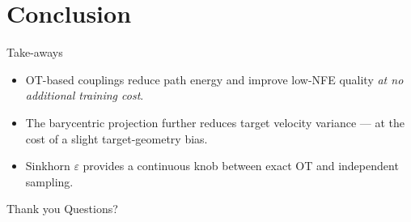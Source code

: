 \documentclass[10pt, aspectratio=169]{beamer}
\begin{document}
\section{Conclusion}

\begin{frame}{Take-aways}
    \begin{itemize}
        \item OT-based couplings reduce path energy and improve low-NFE quality
              \emph{at no additional training cost}.
        \item The barycentric projection further reduces target velocity
              variance --- at the cost of a slight target-geometry bias.
        \item Sinkhorn $\varepsilon$ provides a continuous knob between exact OT
              and independent sampling.
    \end{itemize}
\end{frame}

\begin{frame}{Thank you}
    \centering
    Questions?
\end{frame}
\end{document}

